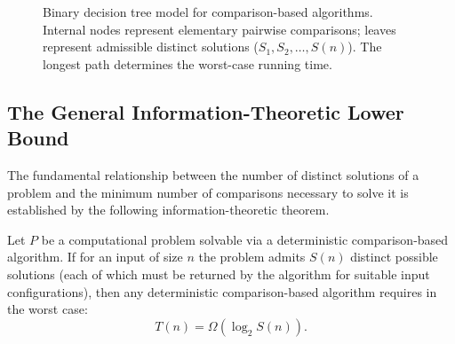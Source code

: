 \begin{figure}[H]
  \caption{Binary decision tree model for comparison-based algorithms. Internal nodes represent elementary pairwise comparisons; leaves represent admissible distinct solutions ($S_1, S_2, \dots, S(n)$). The longest path determines the worst-case running time.}
  \label{fig:decision-tree-model}
\end{figure}

\subsection{The General Information-Theoretic Lower Bound}
\label{subsec:general-information-theorem}

The fundamental relationship between the number of distinct solutions of a problem and the minimum number of comparisons necessary to solve it is established by the following information-theoretic theorem.

\begin{theorem}
\label{thm:information-theoretic-bound}
Let $P$ be a computational problem solvable via a deterministic comparison-based algorithm. If for an input of size $n$ the problem admits $S(n)$ distinct possible solutions (each of which must be returned by the algorithm for suitable input configurations), then any deterministic comparison-based algorithm requires in the worst case:
\begin{equation}
  T(n) = \Omega(\log_2 S(n)).
\end{equation}
\end{theorem}

